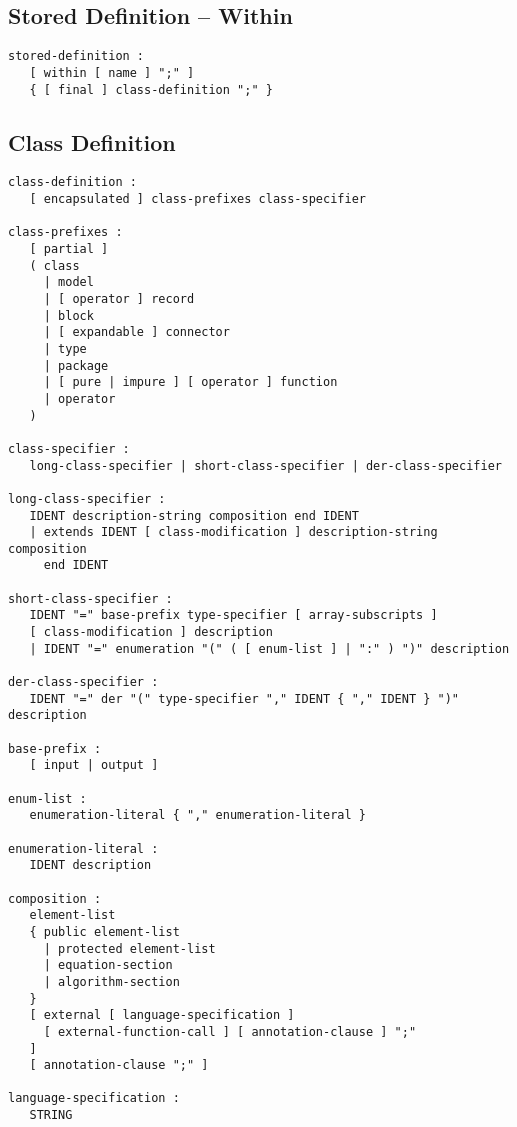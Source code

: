 \subsection{Stored Definition -- Within}\label{stored-definition-within}

\begin{lstlisting}[language=grammar]
stored-definition :
   [ within [ name ] ";" ]
   { [ final ] class-definition ";" }
\end{lstlisting}

\subsection{Class Definition}\label{class-definition}

\begin{lstlisting}[language=grammar]
class-definition :
   [ encapsulated ] class-prefixes class-specifier

class-prefixes :
   [ partial ]
   ( class
     | model
     | [ operator ] record
     | block
     | [ expandable ] connector
     | type
     | package
     | [ pure | impure ] [ operator ] function
     | operator
   )

class-specifier :
   long-class-specifier | short-class-specifier | der-class-specifier

long-class-specifier :
   IDENT description-string composition end IDENT
   | extends IDENT [ class-modification ] description-string composition
     end IDENT

short-class-specifier :
   IDENT "=" base-prefix type-specifier [ array-subscripts ]
   [ class-modification ] description
   | IDENT "=" enumeration "(" ( [ enum-list ] | ":" ) ")" description

der-class-specifier :
   IDENT "=" der "(" type-specifier "," IDENT { "," IDENT } ")" description

base-prefix :
   [ input | output ]

enum-list :
   enumeration-literal { "," enumeration-literal }

enumeration-literal :
   IDENT description

composition :
   element-list
   { public element-list
     | protected element-list
     | equation-section
     | algorithm-section
   }
   [ external [ language-specification ]
     [ external-function-call ] [ annotation-clause ] ";"
   ]
   [ annotation-clause ";" ]

language-specification :
   STRING


\end{lstlisting}
